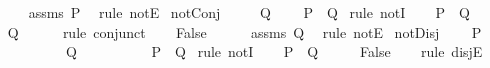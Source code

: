 \begin{isabellebody}
\ \ \ \ \isamarkupfalse%
\ assms\ {\isacartoucheopen}P{\isacartoucheclose}\ \isamarkupfalse%
\ {\isacharparenleft}rule\ notE{\isacharparenright}\isanewline
{}\isamarkupfalse%
%
\endisatagproof
{\isafoldproof}%
%
\isadelimproof
\isanewline
%
\endisadelimproof
\isanewline
{}\isamarkupfalse%
\ notConj{}{\isacharcolon}\ \isanewline
\ \ \ {\isachardoublequoteopen}{\isasymnot}\ Q{\isachardoublequoteclose}\isanewline
\ \ \ {\isachardoublequoteopen}{\isasymnot}\ {\isacharparenleft}P\ {\isasymand}\ Q{\isacharparenright}{\isachardoublequoteclose}\isanewline
%
\isadelimproof
%
\endisadelimproof
%
\isatagproof
{}\isamarkupfalse%
\ {\isacharparenleft}rule\ notI{\isacharparenright}\isanewline
\ \ \isamarkupfalse%
\ {\isachardoublequoteopen}P\ {\isasymand}\ Q{\isachardoublequoteclose}\isanewline
\ \ \isamarkupfalse%
\ \isamarkupfalse%
\ {\isachardoublequoteopen}Q{\isachardoublequoteclose}\isanewline
\ \ \ \ \isamarkupfalse%
\ {\isacharparenleft}rule\ conjunct{}{\isacharparenright}\isanewline
\ \ \isamarkupfalse%
\ {\isachardoublequoteopen}False{\isachardoublequoteclose}\isanewline
\ \ \ \ \isamarkupfalse%
\ assms\ {\isacartoucheopen}Q{\isacartoucheclose}\ \isamarkupfalse%
\ {\isacharparenleft}rule\ notE{\isacharparenright}\isanewline
{}\isamarkupfalse%
%
\endisatagproof
{\isafoldproof}%
%
\isadelimproof
\isanewline
%
\endisadelimproof
\isanewline
{}\isamarkupfalse%
\ notDisj{\isacharcolon}\isanewline
\ \ \ {\isachardoublequoteopen}{\isasymnot}\ P{\isachardoublequoteclose}\isanewline
\ \ \ \ \ \ \ \ \ \ {\isachardoublequoteopen}{\isasymnot}\ Q{\isachardoublequoteclose}\isanewline
\ \ \ \ \ \ \ \ \ {\isachardoublequoteopen}{\isasymnot}\ {\isacharparenleft}P\ {\isasymor}\ Q{\isacharparenright}{\isachardoublequoteclose}\isanewline
%
\isadelimproof
%
\endisadelimproof
%
\isatagproof
{}\isamarkupfalse%
\ {\isacharparenleft}rule\ notI{\isacharparenright}\isanewline
\ \ \isamarkupfalse%
\ {\isachardoublequoteopen}P\ {\isasymor}\ Q{\isachardoublequoteclose}\isanewline
\ \ \isamarkupfalse%
\ \isamarkupfalse%
\ {\isachardoublequoteopen}False{\isachardoublequoteclose}\isanewline
\ \ \isamarkupfalse%
\ {\isacharparenleft}rule\ disjE{\isacharparenright}\isanewline
\ \ \ \ \isamarkupfalse%

\end{isabellebody}
